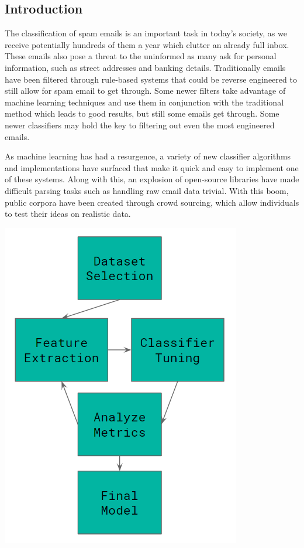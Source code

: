 \documentclass[12pt]{article}
\newenvironment{Figure}
  {\par\medskip\noindent\minipage{\linewidth}}
  {\endminipage\par\medskip}
\begin{document}
    \begin{multicols}{2}
        \section{Introduction}
            The classification of spam emails is an important task in today's society,
            as we receive potentially hundreds of them a year which clutter
            an already full inbox. These emails also pose a threat to the uninformed
            as many ask for personal information, such as street addresses and banking details.
            Traditionally emails have been filtered through rule-based systems that
            could be reverse engineered to still allow for spam email to get through.
            Some newer filters take advantage of machine learning techniques and use
            them in conjunction with the traditional method which leads to good results,
            but still some emails get through. Some newer classifiers may hold the
            key to filtering out even the most engineered emails.
            
            
            As machine learning has had a resurgence, a variety
            of new classifier algorithms and implementations have surfaced that 
            make it quick and easy to implement one of these systems. Along with this,
            an explosion of open-source libraries have made difficult parsing tasks
            such as handling raw email data trivial. With this boom, public corpora
            have been created through crowd sourcing, which allow individuals to
            test their ideas on realistic data.

            \begin{Figure}
                \centering
                \includegraphics[width=0.5\linewidth]{figures/process.png}
                \label{fig:process}
            \end{Figure}



\end{multicols}
\end{document}
